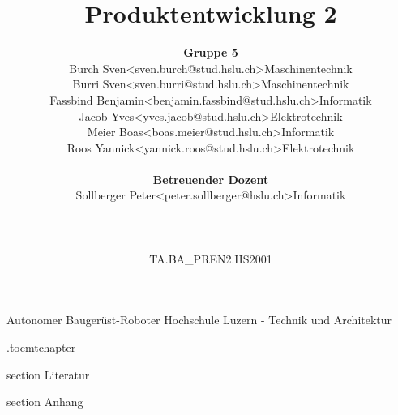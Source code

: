\documentclass[oneside]{modern}
\title{Produktentwicklung 2}
\author{
\begin{tabular}{ l l l}
  \textbf{Gruppe 5} && \\
  Burch Sven & <sven.burch@stud.hslu.ch> & Maschinentechnik\\
  Burri Sven & <sven.burri@stud.hslu.ch> & Maschinentechnik \\
  Fassbind Benjamin & <benjamin.fassbind@stud.hslu.ch> & Informatik \\
  Jacob Yves & <yves.jacob@stud.hslu.ch> & Elektrotechnik\\
  Meier Boas & <boas.meier@stud.hslu.ch> & Informatik\\
  Roos Yannick & <yannick.roos@stud.hslu.ch> & Elektrotechnik \\
  \\
  \textbf{Betreuender Dozent} && \\
  Sollberger Peter & <peter.sollberger@hslu.ch> & Informatik \\
  \\
  \\
  \\
  TA.BA\_PREN2.HS2001 &&\\
\end{tabular}
}
\begin{document}
   \renewcommand{\thesection}{\arabic{section}}
   \makeatletter
   \g@addto@macro{\UrlBreaks}{\UrlOrds}
   \makeatother
   


  \nocite{*}

  \firstpage
    {Autonomer Baugerüst-Roboter}
    {Hochschule Luzern - Technik und Architektur}
    {\theauthor}

  
  
  \newpage
  \etocdepthtag.toc{mtchapter}
  \addtableofcontents
  
  \newpage
  \listoffigures
  
  \newpage
  \listoftables

  \newpage
  
  

  
  
  
  
  
  
  
  
  
  


  \newpage
  \addglossary

  \newpage
    {section}
    {Literatur}

  \printbibliography[
    heading=subbibliography
  ]

    {section}
    {Anhang}
    
  
\end{document}
